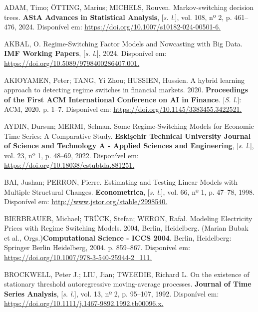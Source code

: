 \documentclass[
  letterpaper,
  DIV=11,
  numbers=noendperiod]{scrartcl}
\newlength{\cslhangindent}
\newenvironment{CSLReferences}[2] %
 {\begin{list}{}{%
  \setlength{\itemindent}{0pt}
  \setlength{\leftmargin}{0pt}
  \setlength{\parsep}{0pt}
  \ifodd #1
   \setlength{\leftmargin}{\cslhangindent}
   \setlength{\itemindent}{-1\cslhangindent}
  \fi
  \setlength{\itemsep}{#2\baselineskip}}}
 {\end{list}}
\numberwithin{equation}{section}
\numberwithin{table}{section}
\numberwithin{figure}{section}
\begin{document}
\label{refs}
\begin{CSLReferences}{0}{1}
ADAM, Timo; ÖTTING, Marius; MICHELS, Rouven. Markov-switching decision
trees. \textbf{AStA Advances in Statistical Analysis}, {[}\emph{s.
l.}{]}, vol. 108, nº 2, p. 461--476, 2024. Disponível em:
\href{https://doi.org/10.1007/s10182-024-00501-6}{https://doi.org/10.1007/s10182-024-00501-6.
}

AKBAL, O. Regime-Switching Factor Models and Nowcasting with Big Data.
\textbf{IMF Working Papers}, {[}\emph{s. l.}{]}, 2024. Disponível em:
\href{https://doi.org/10.5089/9798400286407.001}{https://doi.org/10.5089/9798400286407.001.
}

AKIOYAMEN, Peter; TANG, Yi Zhou; HUSSIEN, Hussien. A hybrid learning
approach to detecting regime switches in financial markets. 2020.
\textbf{Proceedings of the First ACM International Conference on AI in
Finance}. {[}\emph{S. l.}{]}: ACM, 2020. p. 1--7. Disponível em:
\href{https://doi.org/10.1145/3383455.3422521}{https://doi.org/10.1145/3383455.3422521.
}

AYDIN, Dursun; MERMI, Selman. Some Regime-Switching Models for Economic
Time Series: A Comparative Study. \textbf{Eskişehir Technical University
Journal of Science and Technology A - Applied Sciences and Engineering},
{[}\emph{s. l.}{]}, vol. 23, nº 1, p. 48--69, 2022. Disponível em:
\href{https://doi.org/10.18038/estubtda.881251}{https://doi.org/10.18038/estubtda.881251.
}

BAI, Jushan; PERRON, Pierre. Estimating and Testing Linear Models with
Multiple Structural Changes. \textbf{Econometrica}, {[}\emph{s. l.}{]},
vol. 66, nº 1, p. 47--78, 1998. Disponível em:
\href{http://www.jstor.org/stable/2998540}{http://www.jstor.org/stable/2998540.
}

BIERBRAUER, Michael; TRÜCK, Stefan; WERON, Rafał. Modeling Electricity
Prices with Regime Switching Models. 2004, Berlin, Heidelberg. (Marian
Bubak et al., Orgs.)\textbf{Computational Science - ICCS 2004}. Berlin,
Heidelberg: Springer Berlin Heidelberg, 2004. p. 859--867. Disponível
em:
\href{https://doi.org/10.1007/978-3-540-25944-2_111}{https://doi.org/10.1007/978-3-540-25944-2\_111.
}

BROCKWELL, Peter J.; LIU, Jian; TWEEDIE, Richard L. On the existence of
stationary threshold autoregressive moving-average processes.
\textbf{Journal of Time Series Analysis}, {[}\emph{s. l.}{]}, vol. 13,
nº 2, p. 95--107, 1992. Disponível em:
\href{https://doi.org/10.1111/j.1467-9892.1992.tb00096.x}{https://doi.org/10.1111/j.1467-9892.1992.tb00096.x.
}


\end{CSLReferences}
\end{document}
